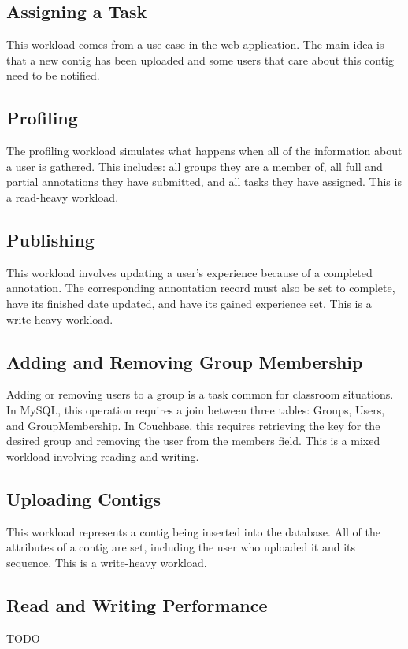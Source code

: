 \documentclass[]{IEEEtran}
\begin{document}
\subsection{Assigning a Task}
This workload comes from a use-case in the web application. The main idea is that a new contig has been uploaded and some users that care about this contig need to be notified. 

\subsection{Profiling}
The profiling workload simulates what happens when all of the information about a user is gathered. This includes: all groups they are a member of, all full and partial annotations they have submitted, and all tasks they have assigned. This is a read-heavy workload.

\subsection{Publishing}
This workload involves updating a user's experience because of a completed annotation. The corresponding annontation record must also be set to complete, have its finished date updated, and have its gained experience set. This is a write-heavy workload.

\subsection{Adding and Removing Group Membership}
Adding or removing users to a group is a task common for classroom situations. In MySQL, this operation requires a join between three tables: Groups, Users, and GroupMembership. In Couchbase, this requires retrieving the key for the desired group and removing the user from the members field. This is a mixed workload involving reading and writing.

\subsection{Uploading Contigs}
This workload represents a contig being inserted into the database. All of the attributes of a contig are set, including the user who uploaded it and its sequence. This is a write-heavy workload.

\subsection{Read and Writing Performance}
TODO
\end{document}
